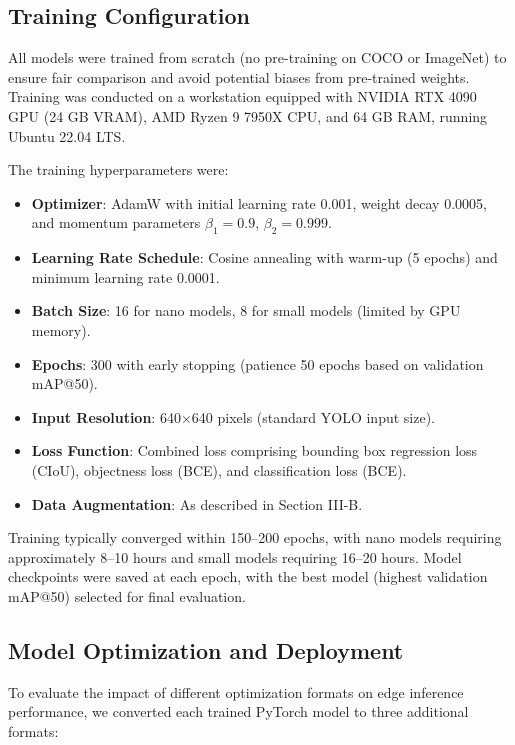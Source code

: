 \subsection{Training Configuration}

All models were trained from scratch (no pre-training on COCO or ImageNet) to ensure fair comparison and avoid potential biases from pre-trained weights. Training was conducted on a workstation equipped with NVIDIA RTX 4090 GPU (24 GB VRAM), AMD Ryzen 9 7950X CPU, and 64 GB RAM, running Ubuntu 22.04 LTS.

The training hyperparameters were:

\begin{itemize}
\item \textbf{Optimizer}: AdamW with initial learning rate 0.001, weight decay 0.0005, and momentum parameters $\beta_1 = 0.9$, $\beta_2 = 0.999$.
\item \textbf{Learning Rate Schedule}: Cosine annealing with warm-up (5 epochs) and minimum learning rate 0.0001.
\item \textbf{Batch Size}: 16 for nano models, 8 for small models (limited by GPU memory).
\item \textbf{Epochs}: 300 with early stopping (patience 50 epochs based on validation mAP@50).
\item \textbf{Input Resolution}: 640$\times$640 pixels (standard YOLO input size).
\item \textbf{Loss Function}: Combined loss comprising bounding box regression loss (CIoU), objectness loss (BCE), and classification loss (BCE).
\item \textbf{Data Augmentation}: As described in Section III-B.
\end{itemize}

Training typically converged within 150--200 epochs, with nano models requiring approximately 8--10 hours and small models requiring 16--20 hours. Model checkpoints were saved at each epoch, with the best model (highest validation mAP@50) selected for final evaluation.

\subsection{Model Optimization and Deployment}

To evaluate the impact of different optimization formats on edge inference performance, we converted each trained PyTorch model to three additional formats:

